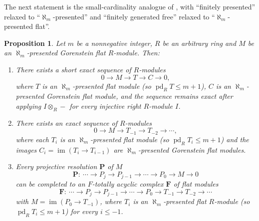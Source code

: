 \documentclass[12pt]{amsart}
\newtheorem{proposition}[theorem]{Proposition}
\theoremstyle{remark}
\theoremstyle{definition}
\theoremstyle{plain}
\DeclareMathOperator{\pd}{pd}
\DeclareMathOperator{\im}{im}
\newcommand{\alephm}{\aleph_m}
\begin{document}
The next statement is the small-cardinality analogue of \cite[Proposition~3.1]{St}, with ``finitely presented'' relaxed to ``$\alephm$-presented'' and ``finitely generated free'' relaxed to ``$\alephm$-presented flat''.
\begin{proposition}\label{prop3.1}
Let $m$ be a nonnegative integer, $R$ be an arbitrary ring and $M$ be an $\alephm$-presented Gorenstein flat $R$-module. Then:
\begin{enumerate}
 \item[(i)] There exists a short exact sequence of $R$-modules
\[
0\rightarrow M\rightarrow T\rightarrow C\rightarrow0,
\]
where $T$ is an $\alephm$-presented flat module (so $\pd_RT\le m+1$), $C$ is an $\alephm$-presented Gorenstein flat module, and the sequence remains exact after applying $I\otimes_R-$ for every injective right $R$-module $I$.

\item[(ii)]There exists an exact sequence of $R$-modules
\[
0\to M\to T_{-1}\to T_{-2}\to\cdots,
\]
where each $T_i$ is an $\alephm$-presented flat module (so $\pd_RT_i\le m+1$) and the images $C_i=\im(T_i\to T_{i-1})$ are $\alephm$-presented Gorenstein flat modules.
\item[(iii)] Every projective resolution $\mathbf P$ of $M$
\[\mathbf P:\ \cdots \rightarrow P_{j} \rightarrow P_{j-1}\rightarrow \cdots \rightarrow P_0 \rightarrow M \rightarrow 0\]
can be completed to an $F$-totally acyclic complex $\mathbf F$ of flat modules
\[\mathbf F:\ \cdots\rightarrow P_{j} \rightarrow P_{j-1}\rightarrow \cdots \rightarrow P_0\to T_{-1}\to T_{-2}\to\cdots\] with $M=\im(P_0\to T_{-1})$, where $T_i$ is an $\alephm$-presented flat $R$-module (so $\pd_RT_i\le m+1$) for every $i\le-1$.
\end{enumerate}
\end{proposition}

\end{document}
